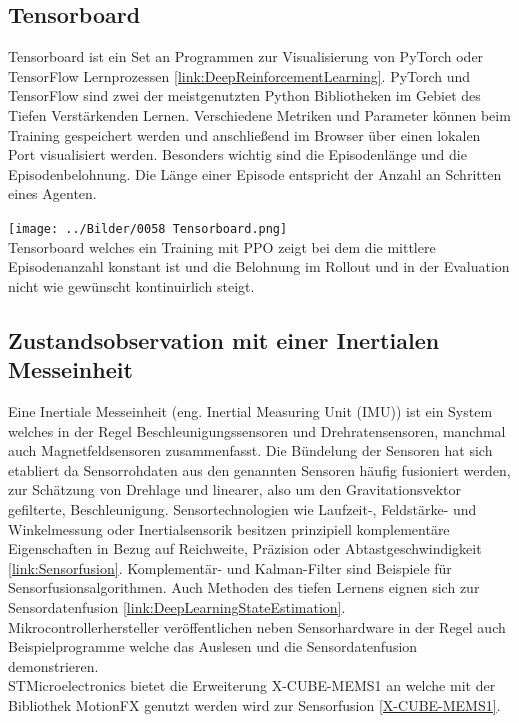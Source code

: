 \subsection{\label{tensorboard}Tensorboard}
Tensorboard ist ein Set an Programmen zur Visualisierung von PyTorch oder TensorFlow Lernprozessen \ref{link:DeepReinforcementLearning}. PyTorch und TensorFlow sind zwei der meistgenutzten Python Bibliotheken im Gebiet des Tiefen Verstärkenden Lernen. Verschiedene Metriken und Parameter können beim Training gespeichert werden und anschließend im Browser über einen lokalen Port visualisiert werden. Besonders wichtig sind die Episodenlänge und die Episodenbelohnung. Die Länge einer Episode entspricht der Anzahl an Schritten eines Agenten. 
\begin{center}
	\texttt{[image: ../Bilder/0058 Tensorboard.png]}{\\Tensorboard welches ein Training mit PPO zeigt bei dem die mittlere Episodenanzahl konstant ist und die Belohnung im Rollout und in der Evaluation nicht wie gewünscht kontinuirlich steigt.}
\end{center}

\subsection{Zustandsobservation mit einer Inertialen Messeinheit}
Eine Inertiale Messeinheit (eng. Inertial Measuring Unit (IMU)) ist ein System welches in der Regel Beschleunigungssensoren und Drehratensensoren, manchmal auch Magnetfeldsensoren zusammenfasst. Die Bündelung der Sensoren hat sich etabliert da Sensorrohdaten aus den genannten Sensoren häufig fusioniert werden, zur Schätzung von Drehlage und linearer, also um den Gravitationsvektor gefilterte, Beschleunigung. Sensortechnologien wie Laufzeit-, Feldstärke- und Winkelmessung oder Inertialsensorik besitzen prinzipiell komplementäre Eigenschaften in Bezug auf Reichweite, Präzision oder Abtastgeschwindigkeit \ref{link:Sensorfusion}.
Komplementär- und Kalman-Filter sind Beispiele für Sensorfusionsalgorithmen. Auch Methoden des tiefen Lernens eignen sich zur Sensordatenfusion \ref{link:DeepLearningStateEstimation}.\\
Mikrocontrollerhersteller veröffentlichen neben Sensorhardware in der Regel auch Beispielprogramme welche das Auslesen und die Sensordatenfusion demonstrieren.\\
STMicroelectronics bietet die Erweiterung X-CUBE-MEMS1 an welche mit der Bibliothek MotionFX genutzt werden wird zur Sensorfusion \ref{X-CUBE-MEMS1}.


